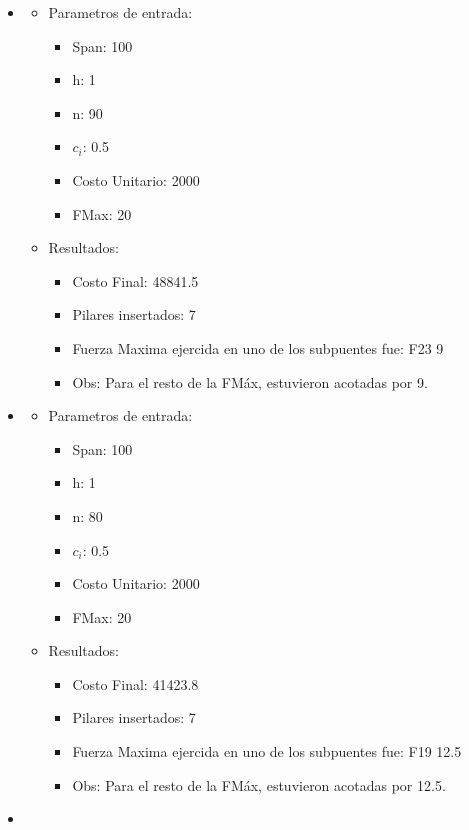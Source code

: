 \begin{itemize}
\item
  \begin{itemize}
    \item Parametros de entrada:
	  \begin{itemize}
	    \item Span: 100
	    \item h: 1
	    \item n: 90
	    \item $c_i$: 0.5
	    \item Costo Unitario: 2000
	    \item FMax: 20
	  \end{itemize}
      \item Resultados:
	  \begin{itemize}
	    \item Costo Final: 48841.5
	    \item Pilares insertados: 7
	    \item Fuerza Maxima ejercida en uno de los subpuentes fue: F23 9
	    \item Obs: Para el resto de la FM\'ax, estuvieron acotadas por 9.
	  \end{itemize}
      \end{itemize}
\item
  \begin{itemize}
    \item Parametros de entrada:
	  \begin{itemize}
	    \item Span: 100
	    \item h: 1
	    \item n: 80
	    \item $c_i$: 0.5
	    \item Costo Unitario: 2000
	    \item FMax: 20
	  \end{itemize}
      \item Resultados:
	  \begin{itemize}
	    \item Costo Final: 41423.8
	    \item Pilares insertados: 7
	    \item Fuerza Maxima ejercida en uno de los subpuentes fue: F19 12.5
	    \item Obs: Para el resto de la FM\'ax, estuvieron acotadas por 12.5.
	  \end{itemize}
      \end{itemize}
\item
  \begin{itemize}

\end{itemize}
\end{itemize}
